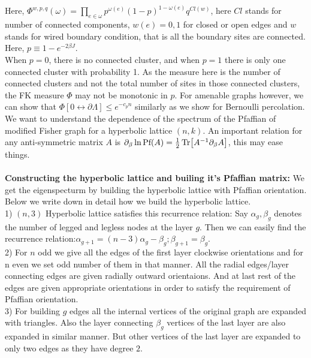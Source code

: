 \documentclass{article}
\begin{document}
     Here, $\Phi^{w,p,q}(\omega)=\prod_{e\in \omega} p^{\omega(e)}(1-p)^{1-\omega(e)}q^{Cl(w)}$, here $Cl$ stands for number of connected components, $w(e)=0,1$ for closed or open edges and $w$ stands for wired boundary condition, that is all the boundary sites are connected. Here, $p \equiv 1-e^{-2\beta J}$.\\
     
     When $p=0$, there is no connected cluster, and when $p=1$ there is only one connected cluster with probability 1. As the measure here is the number of connected clusters and not the total number of sites in those connected clusters, the FK measure $\Phi$ may not be monotonic in $p$. For amenable graphs however, we can show that $\Phi[0 \leftrightarrow \partial \Lambda ] \leq e^{-c_pn}$ similarly as we show for Bernoulli percolation.  \\
     
     We want to understand the dependence of the spectrum of the Pfaffian of modified Fisher graph for a hyperbolic lattice $(n,k)$. An important relation for any anti-symmetric matrix $A$ is $\partial_{\beta} \ln \text{Pf}(A)= \frac{1}{2}\Tr[A^{-1}\partial_{\beta}A]$, this may ease things. \\  
     
     \\
    \vspace{0.5 cm}
     \textbf{Constructing the hyperbolic lattice and builing it's Pfaffian matrix:} We get the eigenspecturm by building the hyperbolic lattice with Pfaffian orientation. Below we write down in detail how we build the hyperbolic lattice.\\
     
     1) $(n,3)$ Hyperbolic lattice satisfies this recurrence relation: Say $\alpha_g, \beta_g$ denotes the number of legged and legless nodes at the layer $g$. Then we can easily find the recurrence relation:$\alpha_{g+1}=(n-3)\alpha_g-\beta_{g} ; \beta_{g+1}=\beta_g$.\\
     
     2) For $n$ odd we give all the edges of the first layer clockwise orientations and for n even we set odd number of them in that manner. All the radial edges/layer connecting edges are given radially outward orientaions. And at last rest of the edges are given appropriate orientations in order to satisfy the requirement of Pfaffian orientation. \\
     
     3) For building $g$ edges all the internal vertices of the original graph are expanded with triangles. Also the layer connecting $\beta_{g}$ vertices of the last layer are also expanded in similar manner. But other vertices of the last layer are expanded to only two edges as they have degree $2$. \\
     
\end{document}
